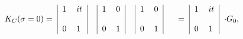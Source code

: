 \begin{equation}\label{Boundary0}
\begin{tabular}{c|ll|c|ll|c|ll|c}
  & $1$ & $it$&&$1$&$0$&&$1$&$0$&\\
$K_C(\sigma=0)=$&&&&&&&&&\\
  & $0$ &
$1$&&$0$&$1$&&$0$&$1$&\\
\end{tabular}\\
\begin{tabular}{c|ll|c}
  & $1$ & $it$&\\
$=$&&&$\cdot G_0$,\\
  & $0$ &
$1$&\\
\end{tabular}\\
\end{equation}

